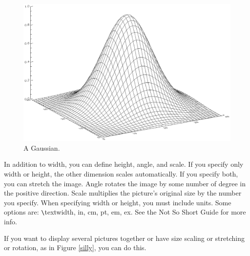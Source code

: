 \documentclass[preprint]{aastex}
\begin{document}
\begin{figure}[h!]
\begin{center}
\includegraphics[width=.6\textwidth]{2dgaussian.ps}
\caption{A Gaussian. \label{gaussfig}}
\end{center}
\end{figure}

In addition to width, you can define height, angle, and scale.  If you
specify only width or height, the other dimension scales automatically.
If you specify both, you can stretch the image.  Angle rotates the image
by some number of degree in the positive direction. Scale multiplies the
picture's original size by the number you specify.
When specifying width or height, you must include units.  Some options
are: \verb$\$textwidth, in, cm, pt, em, ex. See the Not So Short Guide for more
info.

If you want to display several pictures together or have size scaling or
stretching or rotation, as in Figure \ref{silly}, you can do this.
\end{document}
